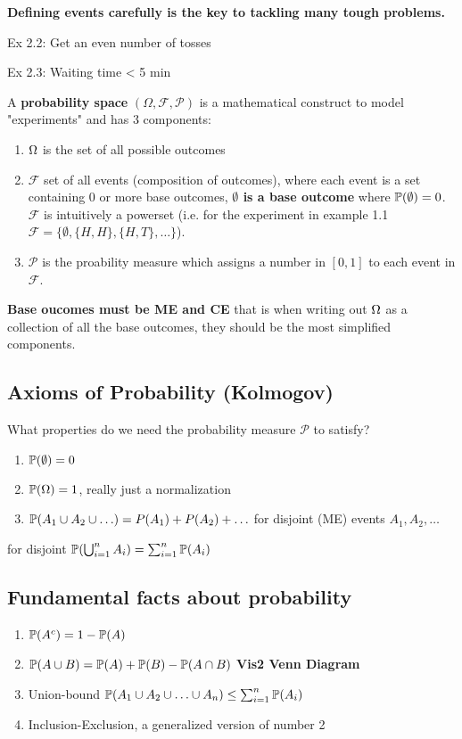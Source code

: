 \documentclass[11pt]{scrartcl}
\begin{document}
\textbf{Defining events carefully is the key to tackling many tough problems.}

\begin{example}
Ex 2.2: Get an even number of tosses
\end{example} 

\begin{example}
Ex 2.3: Waiting time < 5 min
\end{example} 

\begin{definition}
	 A \textbf{probability space} $(\Omega, \mathcal{F} , \mathcal{P} )$ is a mathematical construct
to model "experiments" and has 3 components: \begin{enumerate}
  \item $\Omega$ is the set of all possible outcomes
  \item $\mathcal{F}$ set of all events (composition of outcomes), where each event is a set containing
    0 or more base outcomes, \textbf{$\emptyset$ is a base outcome} where $\mathbb{P}(\emptyset) = 0$.
      $\mathcal{F} $ is intuitively a powerset
    (i.e. for the experiment in example 1.1 $\mathcal{F}=\{\emptyset, \{H,H\}, \{H, T\},
    \ldots\}$).
    \item $\mathcal{P}$ is the proability measure which assigns a number in $[0, 1]$ to each event in $\mathcal{F}$.
\end{enumerate}
\end{definition}

\textbf{Base oucomes must be ME and CE} that is when writing out $\Omega$ as a collection of all the base outcomes, they should be the most simplified components.

\subsection{Axioms of Probability (Kolmogov)}
What properties do we need the probability measure $\mathcal{P} $ to satisfy?
\begin{enumerate}
    \item $\mathbb{P}(\emptyset)=0$ 
    \item $\mathbb{P}(\Omega)=1$, really just a normalization
    \item $\mathbb{P}(A_1\cup A_2\cup\ldots)=P(A_1)+P(A_2)+\ldots$ for disjoint (ME)
      events $A_1,A_2,\ldots$
\end{enumerate}
for disjoint $\mathbb{P}(\bigcup_{i=1}^n A_{i} )= \sum_{i=1}^n \mathbb{P}(A_{i} )$ 
\subsection{Fundamental facts about probability} 
\begin{enumerate}
    \item $\mathbb{P}(A^{c}) = 1 - \mathbb{P}(A)$ 
    \item $\mathbb{P}(A\cup B) =  \mathbb{P}(A)+\mathbb{P}(B)-\mathbb{P}(A\cap B)$ \textbf{Vis2 Venn
      Diagram}  
      \item Union-bound $\mathbb{P}(A_1\cup A_2\cup\ldots\cup A_{n} )\leq \sum_{i=1}
        ^{n} \mathbb{P}(A_{i} )$
      \item Inclusion-Exclusion, a generalized version of number 2
\end{enumerate}
\end{document}
